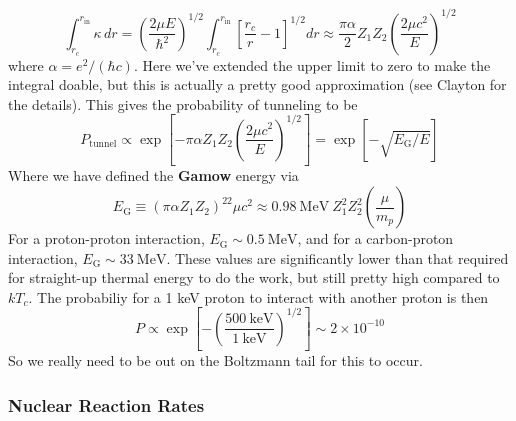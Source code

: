 \documentclass[10pt]{article}
\numberwithin{equation}{section}
\begin{document}
  \begin{equation}
    \label{eq:117}
    \int_{r_c}^{r_{\mathrm{in}}}\kappa\, dr= \left(\frac{2\mu
        E}{\hbar^2}\right)^{1/2}
    \int_{r_c}^{r_{\mathrm{in}}}\left[\frac{r_c}{r}-1\right]^{1/2}dr\approx
    \frac{\pi \alpha}{2}Z_1Z_2\left(\frac{2\mu c^2}{E}\right)^{1/2}
  \end{equation}
  where $\alpha=e^2/(\hbar c)$. Here we've extended the upper limit to zero to make the integral
  doable, but this is actually a pretty good approximation (see
  Clayton for the details). This gives the probability of tunneling to
  be
  \begin{equation}
    \label{eq:118}
    P_{\mathrm{tunnel}}\propto \exp\left[-\pi\alpha
      Z_1Z_2\left(\frac{2\mu c^2}{E}\right)^{1/2}\right]=\exp\left[-\sqrt
{E_\mathrm{G}/E}\right]
  \end{equation}
  Where we have defined the \textbf{Gamow} energy via
  \begin{equation}
    \label{eq:119}
    E_{\mathrm{G}}\equiv \left(\pi\alpha Z_1Z_2\right)^22\mu
    c^2\approx 0.98\ \mathrm{MeV}\ Z_1^2Z_2^2\left(\frac{\mu}{m_p}\right)
  \end{equation}
  For a proton-proton interaction, $E_{\mathrm{G}}\sim 0.5\
  \mathrm{MeV}$, and for a carbon-proton interaction,
  $E_{\mathrm{G}}\sim 33\ \mathrm{MeV}$. These values are
  significantly lower than that required for straight-up thermal
  energy to do the work, but still pretty high compared to $kT_c$. The
  probabiliy for a 1 keV proton to interact with another proton is
  then
  \begin{equation}
    \label{eq:120}
    P\propto \exp\left[-\left(\frac{500\ \mathrm{keV}}{1\
          \mathrm{keV}}\right)^{1/2}\right]\sim 2\times 10^{-10}
  \end{equation}
  So we really need to be out on the Boltzmann tail for this to occur.

  \subsubsection{Nuclear Reaction Rates}
  \label{sec:nucl-react-rates}
\end{document}
